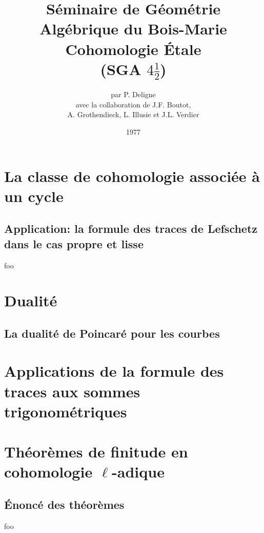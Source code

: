 \documentclass[oneside]{book}
\title{Séminaire de Géométrie Algébrique du Bois-Marie \\ \vspace{20pt}
Cohomologie Étale \\ \vspace{20pt}
(SGA $4\frac 1 2$)}
\author{par P. Deligne \vspace{10pt}\\ 
avec la collaboration de J.F. Boutot, \\ A. Grothendieck, L. Illusie et J.L. Verdier}
\date{1977}
\begin{document}
\maketitle










\tableofcontents












\chapter{La classe de cohomologie associée à un cycle}\label{IV}

\section{Application: la formule des traces de Lefschetz dans le cas propre et lisse}\label{IV:3}

\begin{corollary_}\label{IV:3-7}
foo
\end{corollary_}

\chapter{Dualité}\label{V}

\section{La dualité de Poincaré pour les courbes}\label{V:2}

\chapter{Applications de la formule des traces aux sommes trigonométriques}\label{VI}

\chapter{Théorèmes de finitude en cohomologie \texorpdfstring{$\ell$}{l}-adique}\label{VII}

\section{Énoncé des théorèmes}\label{VII:1}

\begin{theorem_}\label{VII:1-1}
foo
\end{theorem_}












\end{document}
